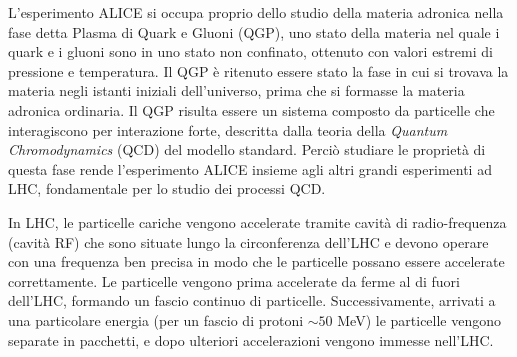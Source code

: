 L'esperimento ALICE si occupa proprio dello studio della materia adronica nella fase detta Plasma di Quark e Gluoni (QGP), uno stato della materia nel quale i quark e i gluoni sono in uno stato non confinato, ottenuto con valori estremi di pressione e temperatura.
Il QGP è ritenuto essere stato la fase in cui si trovava la materia negli istanti iniziali dell'universo, prima che si formasse la materia adronica ordinaria.
Il QGP risulta essere un sistema composto da particelle che interagiscono per interazione forte, descritta dalla teoria della \emph{Quantum Chromodynamics} (QCD) del modello standard.
Perciò studiare le proprietà di questa fase rende l'esperimento ALICE insieme agli altri grandi esperimenti ad LHC, fondamentale per lo studio dei processi QCD.

In LHC, le particelle cariche vengono accelerate tramite cavità di radio-frequenza (cavità RF) che sono situate lungo la circonferenza dell'LHC e devono operare con una frequenza ben precisa in modo che le particelle possano essere accelerate correttamente.
Le particelle vengono prima accelerate da ferme al di fuori dell'LHC, formando un fascio continuo di particelle.
Successivamente, arrivati a una particolare energia (per un fascio di protoni $\sim 50$ MeV) le particelle vengono separate in pacchetti, e dopo ulteriori accelerazioni vengono immesse nell'LHC.
